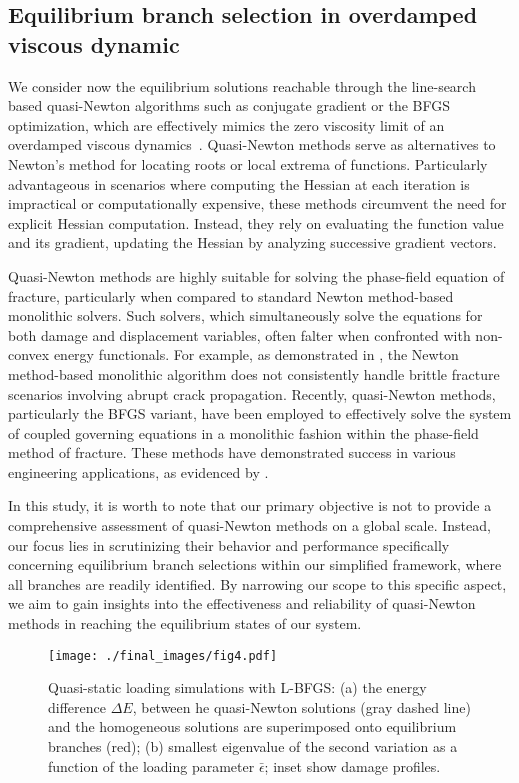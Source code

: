 \subsection{Equilibrium branch selection in overdamped viscous dynamic}
We consider now the equilibrium solutions reachable through the line-search based quasi-Newton algorithms such as  conjugate gradient or the BFGS optimization, which are effectively  mimics the zero viscosity limit of an overdamped viscous dynamics~\cite{SALMAN2012219}. Quasi-Newton methods serve as alternatives to Newton's method for locating roots or local extrema of functions. Particularly advantageous in scenarios where computing the Hessian at each iteration is impractical or computationally expensive, these methods circumvent the need for explicit Hessian computation. Instead, they rely on evaluating the function value and its gradient, updating the Hessian by analyzing successive gradient vectors.

Quasi-Newton methods are highly suitable for solving the phase-field equation of fracture, particularly when compared to standard Newton method-based monolithic solvers. Such solvers, which simultaneously  solve the equations for both damage and displacement variables, often falter when confronted with non-convex energy functionals. For example, as demonstrated in \cite{Wick2017-bo}, the Newton method-based monolithic algorithm does not consistently handle brittle fracture scenarios involving abrupt crack propagation. Recently, quasi-Newton methods, particularly the BFGS variant, have been employed to effectively solve the system of coupled governing equations in a monolithic fashion within the phase-field method of fracture. These methods have demonstrated success in various engineering applications, as evidenced by \cite{Kristensen2020-zy,Wu2020-qk,Salman2021-mn,Liu2022-ix}.

In  this study, it is worth to note that our primary objective is not to provide a comprehensive assessment of quasi-Newton methods on a global scale. Instead, our focus lies in scrutinizing their behavior and performance specifically concerning equilibrium branch selections within our simplified framework, where all branches are readily identified. By narrowing our scope to this specific aspect, we aim to gain insights into the effectiveness and reliability of quasi-Newton methods in reaching the equilibrium states of our system.
\begin{figure}
\texttt{[image: ./final\_images/fig4.pdf]}
    \caption{
Quasi-static loading simulations with L-BFGS: (a) the energy difference $\Delta E$, between he quasi-Newton solutions (gray dashed line) and the homogeneous solutions are superimposed onto equilibrium branches (red); (b) smallest eigenvalue of the second variation  as a function of the loading parameter $\bar\epsilon$; inset show damage profiles.}
    \label{fig:tempo1}
\end{figure}


